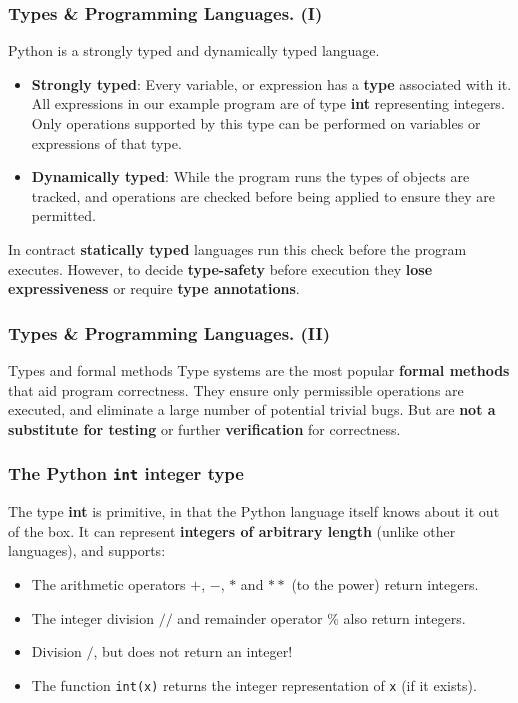 \documentclass{beamer} %
\newcommand\emc[1]{\textcolor{midred}{\textbf{#1}}}
\begin{document}
\begin{frame}
\frametitle{Types \& Programming Languages. (I)}

Python is a strongly typed and dynamically typed language. 
\begin{itemize}
\item \emc{Strongly typed}: Every variable, or expression has a \emc{type} associated with it. All expressions in our example program are of type \emc{int} representing integers. Only operations supported by this type can be performed on variables or expressions of that type.
\item \emc{Dynamically typed}: While the program runs the types of objects are tracked, and operations are checked before being applied to ensure they are permitted. 
\end{itemize}

\vspace{5mm}
In contract \emc{statically typed} languages run this check before the program executes. However, to decide \emc{type-safety} before execution they \emc{lose expressiveness} or require \emc{type annotations}.

\end{frame}

\begin{frame}
\frametitle{Types \& Programming Languages. (II)}

\begin{block}{Types and formal methods}
Type systems are the most popular \emc{formal methods} that aid program correctness. They ensure only permissible operations are executed, and eliminate a large number of potential trivial bugs. But are \emc{not a substitute for testing} or further \emc{verification} for correctness.
\end{block}

\end{frame}

\begin{frame}
\frametitle{The Python \texttt{int} integer type} 

The type \emc{int} is primitive, in that the Python language itself knows about it out of the box. It can represent \emc{integers of arbitrary length} (unlike other languages), and supports:
\begin{itemize}
\item The arithmetic operators $+$, $-$, $*$ and $**$ (to the power) return integers.
\item The integer division $//$ and remainder operator $\%$ also return integers.
\item Division $/$, but does not return an integer!
\item The function \texttt{int(x)} returns the integer representation of \texttt{x} (if it exists).
\end{itemize}

\end{frame}
\end{document}
